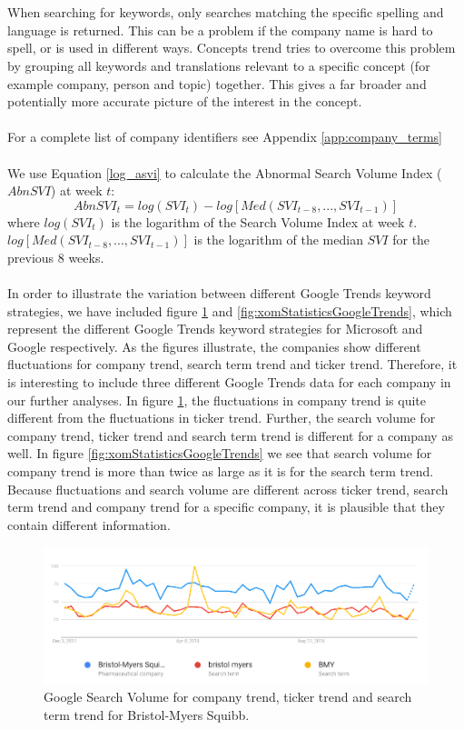 \\\\
When searching for keywords, only searches matching the specific spelling and language is returned. This can be a problem if the company name is hard to spell, or is used in different ways. Concepts trend tries to overcome this problem by grouping all keywords and translations relevant to a specific concept (for example company, person and topic) together. This gives a far broader and potentially more accurate picture of the interest in the concept.
\\\\
For a complete list of company identifiers see Appendix \ref{app:company_terms}
\\\\
We use Equation \eqref{log_asvi} to calculate the Abnormal Search Volume Index ($AbnSVI$) at week $t$:
\begin{equation}
   \label{log_asvi} 
   AbnSVI_{t} = log(SVI_{t}) - log[Med(SVI_{t-8},...,SVI_{t-1})] 
\end{equation}
where $log(SVI_{t})$ is the logarithm of the Search Volume Index at week $t$. $log[Med(SVI_{t-8},...,SVI_{t-1})]$ is the logarithm of the median $SVI$ for the previous 8 weeks.
\\\\
In order to illustrate the variation between different Google Trends keyword strategies, we have included figure \ref{fig:bmyStatisticsGoogleTrends} and \ref{fig:xomStatisticsGoogleTrends}, which represent the different Google Trends keyword strategies for Microsoft and Google respectively. As the figures illustrate, the companies show different fluctuations for company trend, search term trend and ticker trend. Therefore, it is interesting to include three different Google Trends data for each company in our further analyses. In figure \ref{fig:bmyStatisticsGoogleTrends}, the fluctuations in company trend is quite different from the fluctuations in ticker trend. Further, the search volume for company trend, ticker trend and search term trend is different for a company as well. In figure \ref{fig:xomStatisticsGoogleTrends} we see that search volume for company trend is more than twice as large as it is for the search term trend. Because fluctuations and search volume are different across ticker trend, search term trend and company trend for a specific company, it is plausible that they contain different information.   
\begin{figure}[h!]
  \centering
    \includegraphics[width=1\textwidth]{fig/bmyStatisticsGoogleTrendsAddedExplanation.png}
 \caption{Google Search Volume for company trend, ticker trend and search term trend for Bristol-Myers Squibb.}
\label{fig:bmyStatisticsGoogleTrends}
\end{figure}
